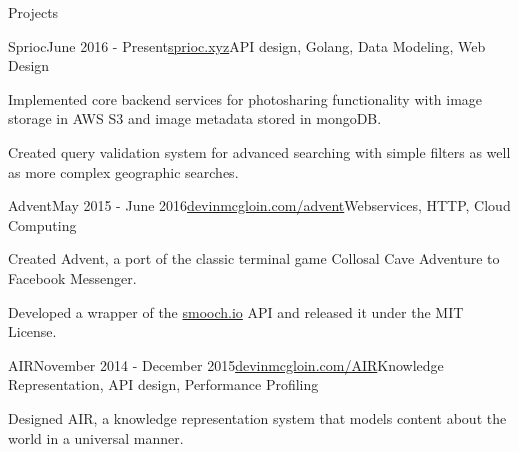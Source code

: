 \documentclass{resume} %
\begin{document}
\begin{rSection}{Projects}


\begin{rSubsection}{Sprioc}{June 2016 - Present}{\href{https://sprioc.xyz}{sprioc.xyz}}{API design, Golang, Data Modeling, Web Design}
\item Implemented core backend services for photosharing functionality with image storage in AWS S3 and image metadata stored in mongoDB.
\item Created query validation system for advanced searching with simple filters as well as more complex geographic searches.
\end{rSubsection}


\begin{rSubsection}{Advent}{May 2015 - June 2016}{\href{https://devinmcgloin.com/advent}{devinmcgloin.com/advent}}{Webservices, HTTP, Cloud Computing}
\item Created Advent, a port of the classic terminal game Collosal Cave Adventure to Facebook Messenger.
\item Developed a wrapper of the \href{https://smooch.io}{smooch.io} API and released it under the MIT License.
\end{rSubsection}


\begin{rSubsection}{AIR}{November 2014 - December 2015}{\href{https://devinmcgloin.com/AIR}{devinmcgloin.com/AIR}}{Knowledge Representation, API design, Performance Profiling}
\item Designed AIR, a knowledge representation system that models content about the world in a universal manner.
\end{rSubsection}
\end{rSection}
\end{document}
